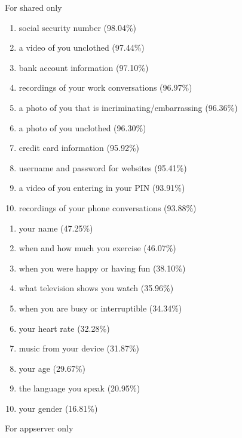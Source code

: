 \documentclass{acm_proc_article-sp}
\begin{document}
For shared only \\[-.8cm]

\begin{enumerate} \itemsep1pt \parskip0pt 
  \item social security number (98.04\%)
  \item a video of you unclothed (97.44\%)
  \item bank account information (97.10\%)
  \item recordings of your work conversations (96.97\%)
  \item a photo of you that is incriminating/embarrassing (96.36\%)
  \item a photo of you unclothed (96.30\%)
  \item credit card information (95.92\%)
  \item username and password for websites (95.41\%)
  \item a video of you entering in your PIN (93.91\%)
  \item recordings of your phone conversations (93.88\%) \\[-.8cm]
\end{enumerate}

\begin{enumerate} \itemsep1pt \parskip0pt 
  \setcounter{enumi}{63}
  \item your name (47.25\%)
  \item when and how much you exercise (46.07\%)
  \item when you were happy or having fun (38.10\%)
  \item what television shows you watch (35.96\%)
  \item when you are busy or interruptible (34.34\%)
  \item your heart rate (32.28\%)
  \item music from your device (31.87\%)
  \item your age (29.67\%)
  \item the language you speak (20.95\%)
  \item your gender (16.81\%) \\[-.8cm]
\end{enumerate}

For appserver only  \\[-.8cm]
\end{document}
